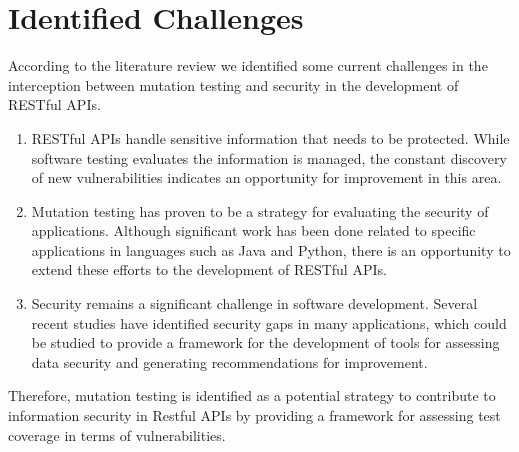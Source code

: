 \section{Identified Challenges}

According to the literature review we identified some current challenges in the interception between mutation testing and security in the development of RESTful APIs.

\begin{enumerate}
    \item RESTful APIs handle sensitive information that needs to be protected. While software testing evaluates the information is managed, the constant discovery of new vulnerabilities indicates an opportunity for improvement in this area.
    \item Mutation testing has proven to be a strategy for evaluating the security of applications. Although significant work has been done related to specific applications in languages such as Java and Python, there is an opportunity to extend these efforts to the development of RESTful APIs.  
    \item Security remains a significant challenge in software development. Several recent studies have identified security gaps in many applications, which could be studied to provide a framework for the development of tools for assessing data security and generating recommendations for improvement.
\end{enumerate}

Therefore, mutation testing is identified as a potential strategy to contribute to information security in Restful APIs by providing a framework for assessing test coverage in terms of vulnerabilities.
